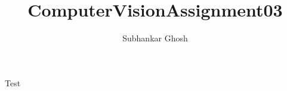 \documentclass{article}
\title{ComputerVisionAssignment03}
\author{Subhankar Ghosh}
\begin{document}
Test
\end{document}
